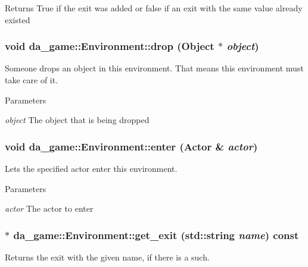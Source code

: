 \begin{DoxyReturn}{Returns}
True if the exit was added or false if an exit with the same value already existed 
\end{DoxyReturn}
\hypertarget{classda__game_1_1Environment_a4d1fb3198721b013f77b79cea398bd35}{
\subsubsection[{drop}]{\setlength{\rightskip}{0pt plus 5cm}void da\_\-game::Environment::drop ({\bf Object} $\ast$ {\em object})}}
\label{classda__game_1_1Environment_a4d1fb3198721b013f77b79cea398bd35}
Someone drops an object in this environment. That means this environment must take care of it.


\begin{DoxyParams}{Parameters}
\item[{\em object}]The object that is being dropped \end{DoxyParams}
\hypertarget{classda__game_1_1Environment_a194d9cfcdf2c86431d83dd5bc686c489}{
\subsubsection[{enter}]{\setlength{\rightskip}{0pt plus 5cm}void da\_\-game::Environment::enter ({\bf Actor} \& {\em actor})}}
\label{classda__game_1_1Environment_a194d9cfcdf2c86431d83dd5bc686c489}
Lets the specified actor enter this environment.


\begin{DoxyParams}{Parameters}
\item[{\em actor}]The actor to enter \end{DoxyParams}
\hypertarget{classda__game_1_1Environment_ad0b26526cf4a76fa7827ab6cb539d98b}{
\subsubsection[{get\_\-exit}]{ $\ast$ da\_\-game::Environment::get\_\-exit (std::string {\em name}) const}}
\label{classda__game_1_1Environment_ad0b26526cf4a76fa7827ab6cb539d98b}
Returns the exit with the given name, if there is a such.


